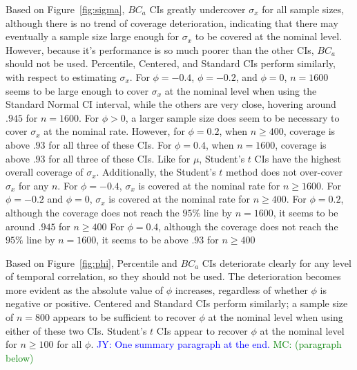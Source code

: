 \documentclass[12pt, letterpaper, titlepage]{article}
\newcommand{\jy}[1]{\textcolor{blue}{JY: #1}}
\newcommand{\mc}[1]{\textcolor{green}{MC: (#1)}}
\begin{document}
Based on Figure~\ref{fig:sigma}, 
$BC_a$ CIs greatly undercover $\sigma_x$ for all sample sizes, although
there is no trend of coverage deterioration, indicating that there may eventually
a sample size large enough for $\sigma_x$ to be covered at the nominal level.
However, because it's performance is so much poorer than the other CIs,
$BC_a$ should not be used. Percentile, Centered, and Standard CIs perform similarly,
with respect to estimating $\sigma_x$. For $\phi = -0.4$, $\phi = -0.2$, and $\phi = 0$, 
$n = 1600$ seems to be large enough to cover $\sigma_x$ at the nominal level
when using the Standard Normal CI interval, while the others are very close, hovering
around $.945$ for $n = 1600$. For $\phi > 0$, a larger sample size does seem
to be necessary to cover $\sigma_x$ at the nominal rate. However, for $\phi = 0.2$, 
when $n \geq 400$, coverage is above $.93$ for all three of these CIs. For $\phi = 0.4$,
when $n = 1600$, coverage is above $.93$ for all three of these CIs.
Like for $\mu$, Student's $t$ CIs have the highest overall coverage of $\sigma_x$.
Additionally, the Student's $t$ method does not over-cover $\sigma_x$ for any $n$.
For $\phi = -0.4$, $\sigma_x$ is covered at the nominal rate for $n \geq 1600$.
For $\phi = -0.2$ and $\phi = 0$, $\sigma_x$ is covered at the nominal rate for $n \geq 400$.
For $\phi = 0.2$, although the coverage does not reach the $95\%$ line by $n = 1600$, 
it seems to be around $.945$ for $n \geq 400$
For $\phi = 0.4$, although the coverage does not reach the $95\%$ line by $n = 1600$, 
it seems to be above $.93$ for $n \geq 400$

Based on Figure~\ref{fig:phi}, 
Percentile and $BC_a$ CIs deteriorate clearly for any level of temporal correlation,
so they should not be used. The deterioration becomes more evident
as the absolute value of $\phi$ increases, regardless of whether $\phi$ is 
negative or positive. Centered and Standard CIs perform similarly;
a sample size of $n = 800$ appears to be sufficient to recover $\phi$ at the 
nominal level when using either of these two CIs. 
Student's $t$ CIs appear to recover $\phi$ at the nominal level for $n \geq 100$ for all 
$\phi$.
\jy{One summary paragraph at the end.}
\mc{paragraph below}
\end{document}
